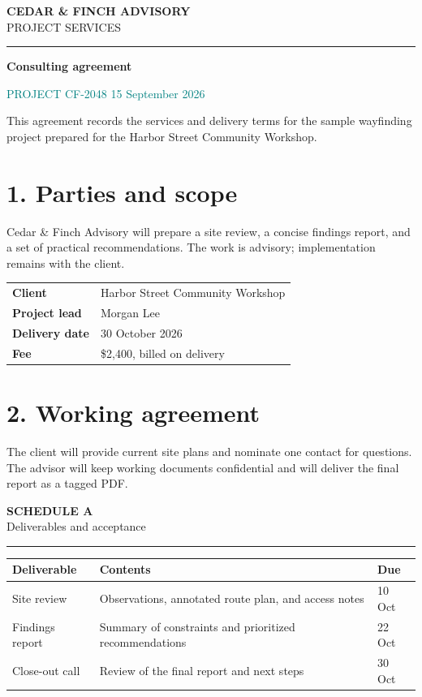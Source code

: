 \documentclass[a4paper,10pt]{article}
\begin{document}
\begin{center}
  {\Large\bfseries\color{ink} CEDAR \& FINCH ADVISORY}\\[4pt]
  {\small PROJECT SERVICES}
\end{center}
\vspace{8pt}
\hrule
\vspace{16pt}

{\LARGE\bfseries Consulting agreement}

\textcolor{teal}{PROJECT CF-2048 \hfill 15 September 2026}

This agreement records the services and delivery terms for the sample
wayfinding project prepared for the Harbor Street Community Workshop.

\section*{1. Parties and scope}

Cedar \& Finch Advisory will prepare a site review, a concise findings report,
and a set of practical recommendations. The work is advisory; implementation
remains with the client.

\begin{tabularx}{\textwidth}{@{}>{\bfseries}p{32mm}X@{}}
\toprule
Client & Harbor Street Community Workshop\\
Project lead & Morgan Lee\\
Delivery date & 30 October 2026\\
Fee & \$2,400, billed on delivery\\
\bottomrule
\end{tabularx}

\section*{2. Working agreement}

The client will provide current site plans and nominate one contact for
questions. The advisor will keep working documents confidential and will
deliver the final report as a tagged PDF.

\newpage
\begin{center}
  {\Large\bfseries\color{ink} SCHEDULE A}\\[4pt]
  {\large Deliverables and acceptance}
\end{center}
\vspace{12pt}
\hrule
\vspace{14pt}

\begin{tabularx}{\textwidth}{@{}p{34mm}X p{25mm}@{}}
\toprule
\textbf{Deliverable} & \textbf{Contents} & \textbf{Due}\\
\midrule
Site review & Observations, annotated route plan, and access notes & 10 Oct\\
Findings report & Summary of constraints and prioritized recommendations & 22 Oct\\
Close-out call & Review of the final report and next steps & 30 Oct\\
\bottomrule
\end{tabularx}
\end{document}
